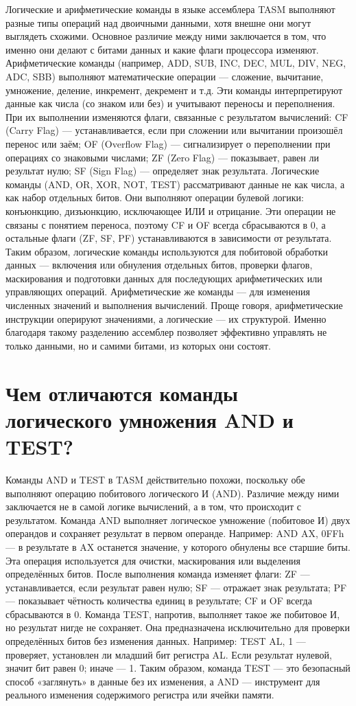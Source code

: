 Логические и арифметические команды в языке ассемблера TASM выполняют разные типы операций над двоичными данными, хотя внешне они могут выглядеть схожими. Основное различие между ними заключается в том, что именно они делают с битами данных и какие флаги процессора изменяют.
Арифметические команды (например, ADD, SUB, INC, DEC, MUL, DIV, NEG, ADC, SBB) выполняют математические операции — сложение, вычитание, умножение, деление, инкремент, декремент и т.д. Эти команды интерпретируют данные как числа (со знаком или без) и учитывают переносы и переполнения. При их выполнении изменяются флаги, связанные с результатом вычислений:
CF (Carry Flag) — устанавливается, если при сложении или вычитании произошёл перенос или заём;
OF (Overflow Flag) — сигнализирует о переполнении при операциях со знаковыми числами;
ZF (Zero Flag) — показывает, равен ли результат нулю;
SF (Sign Flag) — определяет знак результата.
Логические команды (AND, OR, XOR, NOT, TEST) рассматривают данные не как числа, а как набор отдельных битов. Они выполняют операции булевой логики: конъюнкцию, дизъюнкцию, исключающее ИЛИ и отрицание. Эти операции не связаны с понятием переноса, поэтому CF и OF всегда сбрасываются в 0, а остальные флаги (ZF, SF, PF) устанавливаются в зависимости от результата.
Таким образом, логические команды используются для побитовой обработки данных — включения или обнуления отдельных битов, проверки флагов, маскирования и подготовки данных для последующих арифметических или управляющих операций. Арифметические же команды — для изменения численных значений и выполнения вычислений.
Проще говоря, арифметические инструкции оперируют значениями, а логические — их структурой. Именно благодаря такому разделению ассемблер позволяет эффективно управлять не только данными, но и самими битами, из которых они состоят.

\section{Чем отличаются команды логического умножения AND и TEST?}

Команды AND и TEST в TASM действительно похожи, поскольку обе выполняют операцию побитового логического И (AND). Различие между ними заключается не в самой логике вычислений, а в том, что происходит с результатом.
Команда AND выполняет логическое умножение (побитовое И) двух операндов и сохраняет результат в первом операнде. Например:
AND AX, 0FFh — в результате в AX останется значение, у которого обнулены все старшие биты.
Эта операция используется для очистки, маскирования или выделения определённых битов. После выполнения команда изменяет флаги:
ZF — устанавливается, если результат равен нулю;
SF — отражает знак результата;
PF — показывает чётность количества единиц в результате;
CF и OF всегда сбрасываются в 0.
Команда TEST, напротив, выполняет такое же побитовое И, но результат нигде не сохраняет. Она предназначена исключительно для проверки определённых битов без изменения данных. Например:
TEST AL, 1 — проверяет, установлен ли младший бит регистра AL. Если результат нулевой, значит бит равен 0; иначе — 1.
Таким образом, команда TEST — это безопасный способ «заглянуть» в данные без их изменения, а AND — инструмент для реального изменения содержимого регистра или ячейки памяти.

